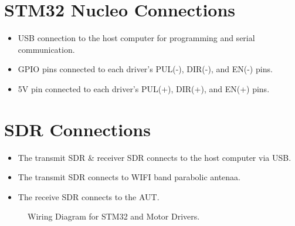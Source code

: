 \section{STM32 Nucleo Connections}

\begin{itemize}
  \item USB connection to the host computer for programming and serial communication.
  \item GPIO pins connected to each driver's PUL(-), DIR(-), and EN(-) pins.
  \item 5V pin connected to each driver's PUL(+), DIR(+), and EN(+) pins.
\end{itemize}

\section{SDR Connections}

\begin{itemize}
  \item The transmit SDR \& receiver SDR connects to the host computer via USB.
  \item The transmit SDR connects to WIFI band parabolic antenaa.
  \item The receive SDR connects to the AUT.
\end{itemize}

\begin{figure}[h!]
    \footnotesize
    \begin{centering}
    
    \end{centering}
    \caption{Wiring Diagram for STM32 and Motor Drivers.}
    \label{fig:wiring}
\end{figure}
